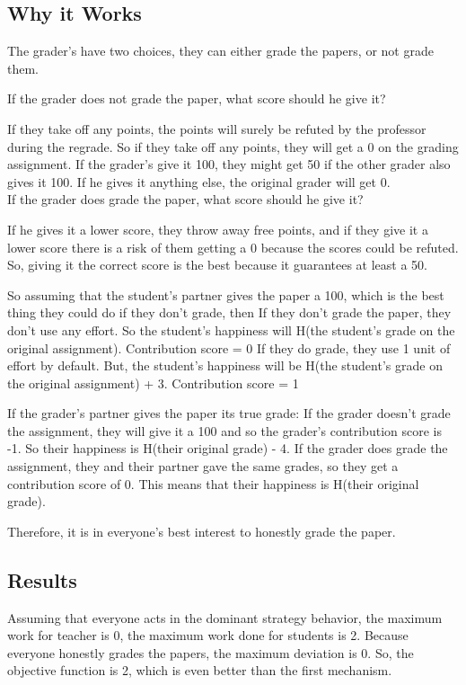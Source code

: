 \documentclass[12pt, Arial]{article}
\begin{document}
\subsection{Why it Works}
The grader's have two choices, they can either grade the papers, or not grade them.

If the grader does not grade the paper, what score should he give it?

If they take off any points, the points will surely be refuted by the professor during the regrade.
So if they take off any points, they will get a 0 on the grading assignment.
If the grader's give it 100, they might get 50 if the other grader also gives it 100. If he gives it anything else, the original grader will get 0.
$$$$
If the grader does grade the paper, what score should he give it?

If he gives it a lower score, they throw away free points, and if they give it a lower score there is a risk of them getting a 0 because the scores could be refuted. So, giving it the correct score is the best because it guarantees at least a 50.

So assuming that the student's partner gives the paper a 100, which is the best thing they could do if they don't grade, then
	If they don't grade the paper, they don't use any effort. So the student's happiness will H(the student's grade on the original assignment). Contribution score = 0
	If they do grade, they use 1 unit of effort by default. But, the student's happiness will be H(the student's grade on the original assignment) + 3. Contribution score = 1
	
If the grader's partner gives the paper its true grade:
	If the grader doesn't grade the assignment, they will give it a 100 and so the grader's contribution score is -1. So their happiness is H(their original grade) - 4.
	If the grader does grade the assignment, they and their partner gave the same grades, so they get a contribution score of 0. This means that their happiness is H(their original grade). 
	
Therefore, it is in everyone's best interest to honestly grade the paper.

\subsection{Results}
Assuming that everyone acts in the dominant strategy behavior, the maximum work for teacher is 0, the maximum work done for students is 2. 
Because everyone honestly grades the papers, the maximum deviation is 0.
So, the objective function is 2, which is even better than the first mechanism.
\end{document}
